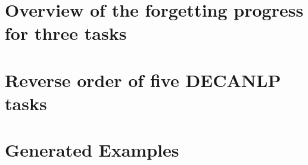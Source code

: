 \documentclass{article} %
\begin{document}
\clearpage
\section{Overview of the forgetting progress for three tasks}
\label{appendix:small_perm}


\clearpage
\section{Reverse order of five DECANLP tasks}
\label{appendix:r_five_tasks}



\clearpage
\section{Generated Examples}

\end{document}
